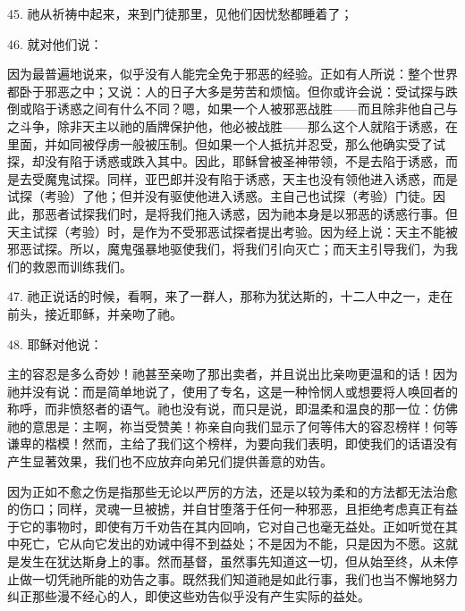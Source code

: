 45. 祂从祈祷中起来，来到门徒那里，见他们因忧愁都睡着了；\par

46. 就对他们说：\par

因为最普遍地说来，似乎没有人能完全免于邪恶的经验。正如有人所说：整个世界都卧于邪恶之中；又说：人的日子大多是劳苦和烦恼。但你或许会说：受试探与跌倒或陷于诱惑之间有什么不同？嗯，如果一个人被邪恶战胜——而且除非他自己与之斗争，除非天主以祂的盾牌保护他，他必被战胜——那么这个人就陷于诱惑，在里面，并如同被俘虏一般被压制。但如果一个人抵抗并忍受，那么他确实受了试探，却没有陷于诱惑或跌入其中。因此，耶稣曾被圣神带领，不是去陷于诱惑，而是去受魔鬼试探。同样，亚巴郎并没有陷于诱惑，天主也没有领他进入诱惑，而是试探（考验）了他；但并没有驱使他进入诱惑。主自己也试探（考验）门徒。因此，那恶者试探我们时，是将我们拖入诱惑，因为祂本身是以邪恶的诱惑行事。但天主试探（考验）时，是作为不受邪恶试探者提出考验。因为经上说：天主不能被邪恶试探。所以，魔鬼强暴地驱使我们，将我们引向灭亡；而天主引导我们，为我们的救恩而训练我们。\par

47. 祂正说话的时候，看啊，来了一群人，那称为犹达斯的，十二人中之一，走在前头，接近耶稣，并亲吻了祂。\par

48. 耶稣对他说：\par

主的容忍是多么奇妙！祂甚至亲吻了那出卖者，并且说出比亲吻更温和的话！因为祂并没有说：而是简单地说了，使用了专名，这是一种怜悯人或想要将人唤回者的称呼，而非愤怒者的语气。祂也没有说，而只是说，即温柔和温良的那一位：仿佛祂的意思是：主啊，祢当受赞美！祢亲自向我们显示了何等伟大的容忍榜样！何等谦卑的楷模！然而，主给了我们这个榜样，为要向我们表明，即使我们的话语没有产生显著效果，我们也不应放弃向弟兄们提供善意的劝告。\par

因为正如不愈之伤是指那些无论以严厉的方法，还是以较为柔和的方法都无法治愈的伤口；同样，灵魂一旦被掳，并自甘堕落于任何一种邪恶，且拒绝考虑真正有益于它的事物时，即使有万千劝告在其内回响，它对自己也毫无益处。正如听觉在其中死亡，它从向它发出的劝诫中得不到益处；不是因为不能，只是因为不愿。这就是发生在犹达斯身上的事。然而基督，虽然事先知道这一切，但从始至终，从未停止做一切凭祂所能的劝告之事。既然我们知道祂是如此行事，我们也当不懈地努力纠正那些漫不经心的人，即使这些劝告似乎没有产生实际的益处。\par

